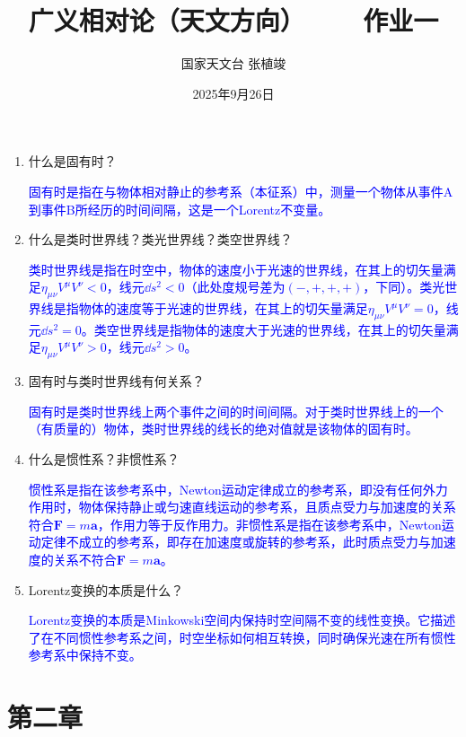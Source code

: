 \documentclass[a4paper]{article}
\title{\textbf{广义相对论（天文方向）\ \ \ \ 作业一}}
\author{国家天文台 张植竣}
\date{2025年9月26日}
\begin{document}
\maketitle

\begin{enumerate}
    \item 什么是固有时？

    \textcolor{blue}{
        固有时是指在与物体相对静止的参考系（本征系）中，测量一个物体从事件A到事件B所经历的时间间隔，这是一个Lorentz不变量。
    }

    \item 什么是类时世界线？类光世界线？类空世界线？

    \textcolor{blue}{
        类时世界线是指在时空中，物体的速度小于光速的世界线，在其上的切矢量满足$\eta_{\mu\nu} V^\mu V^\nu < 0$，线元$\dd{s}^2 < 0$（此处度规号差为$(-, +, +, +)$，下同）。类光世界线是指物体的速度等于光速的世界线，在其上的切矢量满足$\eta_{\mu\nu} V^\mu V^\nu = 0$，线元$\dd{s}^2 = 0$。类空世界线是指物体的速度大于光速的世界线，在其上的切矢量满足$\eta_{\mu\nu} V^\mu V^\nu > 0$，线元$\dd{s}^2 > 0$。
    }
    \item 固有时与类时世界线有何关系？

    \textcolor{blue}{
        固有时是类时世界线上两个事件之间的时间间隔。对于类时世界线上的一个（有质量的）物体，类时世界线的线长的绝对值就是该物体的固有时。
    }

    \item 什么是惯性系？非惯性系？

    \textcolor{blue}{
        惯性系是指在该参考系中，Newton运动定律成立的参考系，即没有任何外力作用时，物体保持静止或匀速直线运动的参考系，且质点受力与加速度的关系符合$\mathbf{F} = m\mathbf{a}$，作用力等于反作用力。非惯性系是指在该参考系中，Newton运动定律不成立的参考系，即存在加速度或旋转的参考系，此时质点受力与加速度的关系不符合$\mathbf{F} = m\mathbf{a}$。
    }

    \item Lorentz变换的本质是什么？

    \textcolor{blue}{
        Lorentz变换的本质是Minkowski空间内保持时空间隔不变的线性变换。它描述了在不同惯性参考系之间，时空坐标如何相互转换，同时确保光速在所有惯性参考系中保持不变。
    }
\end{enumerate}

\clearpage
\section*{第二章}
\end{document}
